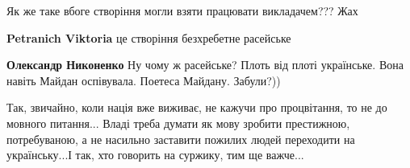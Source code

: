 \begin{itemize}
Як же таке вбоге створіння могли взяти працювати викладачем??? Жах

\begin{itemize}

\textbf{Petranich Viktoria} це створіння безхребетне расейське


\textbf{Олександр Никоненко} Ну чому ж расейське? Плоть від плоті українське.
Вона навіть Майдан оспівувала. Поетеса Майдану. Забули?))
\end{itemize}



Так, звичайно, коли нація вже виживає, не кажучи про процвітання, то не до
мовного питання... Владі треба думати як мову зробити престижною, потребуваною,
а не насильно заставити пожилих людей переходити на українську...І так, хто
говорить на суржику, тим ще важче...
\end{itemize}


